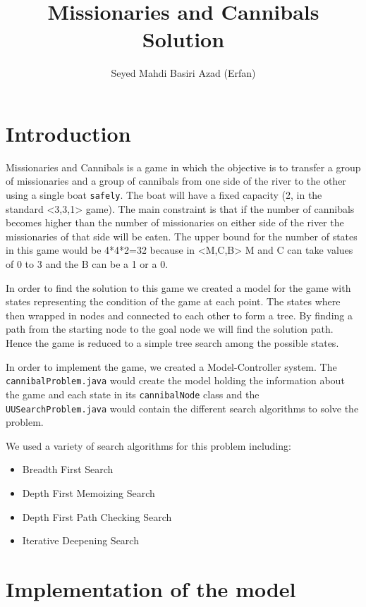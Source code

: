 \documentclass{article}
\title{Missionaries and Cannibals Solution}
\author{Seyed Mahdi Basiri Azad (Erfan)}
\begin{document}
\maketitle

\section{Introduction}
Missionaries and Cannibals is a game in which the objective is to transfer a group of missionaries and a group of cannibals from one side of the river to the other using a single boat \verb`safely`. The boat will have a fixed capacity (2, in the standard <3,3,1> game). The main constraint is that if the number of cannibals becomes higher than the number of missionaries on either side of the river the missionaries of that side will be eaten. The upper bound for the number of states in this game would be 4*4*2=32 because in <M,C,B> M and C can take values of 0 to 3 and the B can be a 1 or a 0.


In order to find the solution to this game we created a model for the game with states representing the condition of the game at each point. The states where then wrapped in nodes and connected to each other to form a tree. By finding a path from the starting node to the goal node we will find the solution path. Hence the game is reduced to a simple tree search among the possible states.


In order to implement the game, we created a Model-Controller system. The \verb`cannibalProblem.java` would create the model holding the information about the game and each state in its \verb`cannibalNode` class and the \verb`UUSearchProblem.java` would contain the different search algorithms to solve the problem.


We used a variety of search algorithms for this problem including:
\begin{itemize}
\item Breadth First Search
\item Depth First Memoizing Search
\item Depth First Path Checking Search
\item Iterative Deepening Search
\end{itemize}



\section{Implementation of the model}
\end{document}
